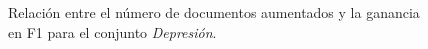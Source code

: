 \begin{figure}[hbt!]
    \caption{Relación entre el número de documentos aumentados y la ganancia en F1 para el conjunto \textit{Depresión}.}
    \label{fig:aumento_n_depresion}
\end{figure}
